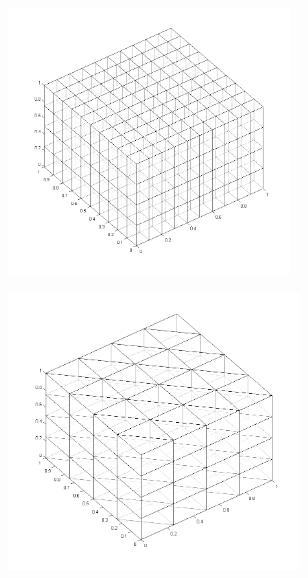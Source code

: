 \begin{figure}
\centering
	\begin{subfigure}[b]{0.5\textwidth}
		\centering
		\includegraphics[width=0.82\textwidth]{figures/sec_DSA/SIP_cart_extruded_mesh.png}
		\caption{}
	\end{subfigure}
	\vfill
	\begin{subfigure}[b]{0.45\textwidth}
		\centering
		\includegraphics[width=0.85\textwidth]{figures/sec_DSA/SIP_tri_extruded_mesh.png}
		\caption{}
	\end{subfigure}
	\hfill
	\begin{subfigure}[b]{0.45\textwidth}

\end{subfigure}
\end{figure}
